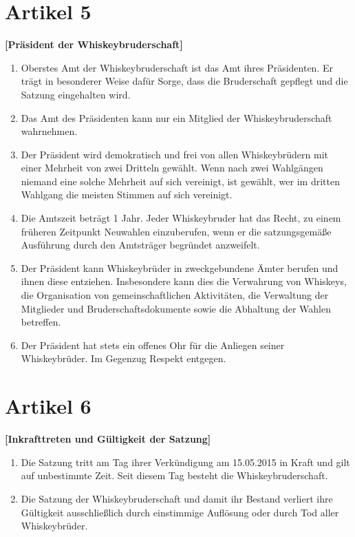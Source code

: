 \documentclass[a4paper,12pt]{article}
\begin{document}
\section*{Artikel 5}
\textbf{[Präsident der Whiskeybruderschaft]}

\begin{enumerate}

\item Oberstes Amt der Whiskeybruderschaft ist das Amt ihres Präsidenten. Er trägt in besonderer
  Weise dafür Sorge, dass die Bruderschaft gepflegt und die Satzung eingehalten wird.

\item Das Amt des Präsidenten kann nur ein Mitglied der Whiskeybruderschaft wahrnehmen.

\item Der Präsident wird demokratisch und frei von allen Whiskeybrüdern mit einer Mehrheit von zwei
  Dritteln gewählt. Wenn nach zwei Wahlgängen niemand eine solche Mehrheit auf sich vereinigt, ist
  gewählt, wer im dritten Wahlgang die meisten Stimmen auf sich vereinigt.

\item Die Amtszeit beträgt 1 Jahr. Jeder Whiskeybruder hat das Recht, zu einem früheren Zeitpunkt
  Neuwahlen einzuberufen, wenn er die satzungsgemäße Ausführung durch den Amtsträger begründet
  anzweifelt.

\item Der Präsident kann Whiskeybrüder in zweckgebundene Ämter berufen und ihnen diese entziehen.
  Insbesondere kann dies die Verwahrung von Whiskeys, die Organisation von gemeinschaftlichen
  Aktivitäten, die Verwaltung der Mitglieder und Bruderschaftsdokumente sowie die Abhaltung der
  Wahlen betreffen.

\item Der Präsident hat stets ein offenes Ohr für die Anliegen seiner Whiskeybrüder. Im Gegenzug
  Respekt entgegen.

\end{enumerate}



\section*{Artikel 6}
\textbf{[Inkrafttreten und Gültigkeit der Satzung]}

\begin{enumerate}

\item Die Satzung tritt am Tag ihrer Verkündigung am 15.05.2015 in Kraft und gilt auf unbestimmte
  Zeit. Seit diesem Tag besteht die Whiskeybruderschaft.

\item Die Satzung der Whiskeybruderschaft und damit ihr Bestand verliert ihre Gültigkeit
  ausschließlich durch einstimmige Auflösung oder durch Tod aller Whiskeybrüder.

\end{enumerate}
\end{document}
